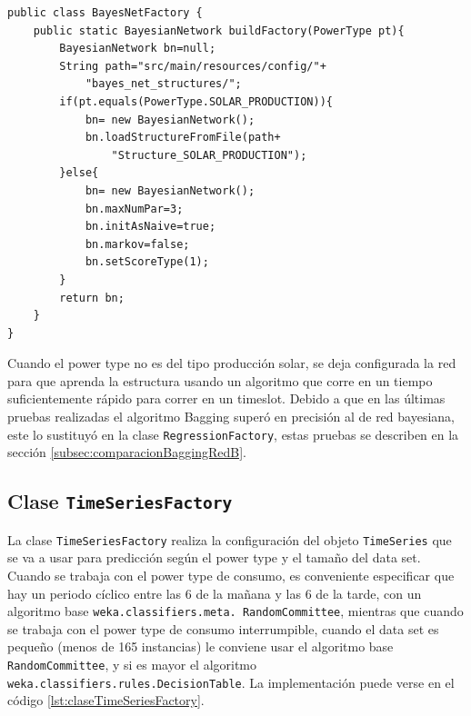 \begin{lstlisting}[frame=single]  
public class BayesNetFactory {
	public static BayesianNetwork buildFactory(PowerType pt){
		BayesianNetwork bn=null;
		String path="src/main/resources/config/"+
			"bayes_net_structures/";
		if(pt.equals(PowerType.SOLAR_PRODUCTION)){
			bn= new BayesianNetwork();
			bn.loadStructureFromFile(path+
				"Structure_SOLAR_PRODUCTION");
		}else{
			bn= new BayesianNetwork(); 
			bn.maxNumPar=3;
			bn.initAsNaive=true;
			bn.markov=false;
			bn.setScoreType(1);
		}
		return bn;
	}
}
\end{lstlisting}
Cuando el power type no es del tipo producción solar, se deja configurada la red para que aprenda la estructura usando un algoritmo que corre en un tiempo suficientemente rápido para correr en un timeslot. Debido a que en las últimas pruebas realizadas el algoritmo Bagging superó en precisión al de red bayesiana, este lo sustituyó en la clase \texttt{RegressionFactory}, estas pruebas se describen en la sección \ref{subsec:comparacionBaggingRedB}.

\subsection{Clase \texttt{TimeSeriesFactory}} \label{subsec:claseTimeSeriesFactory}
La clase \texttt{TimeSeriesFactory} realiza la configuración del objeto \texttt{TimeSeries} que se va a usar para predicción según el power type y el tamaño del data set. Cuando se trabaja con el power type de consumo, es conveniente especificar que hay un periodo cíclico entre las 6 de la mañana y las 6 de la tarde, con un algoritmo base \texttt{weka.classifiers.meta. RandomCommittee}, mientras que cuando se trabaja con el power type de consumo interrumpible, cuando el data set es pequeño (menos de 165 instancias) le conviene usar el algoritmo base \texttt{RandomCommittee}, y si es mayor el algoritmo \texttt{weka.classifiers.rules.DecisionTable}. La implementación puede verse en el código \ref{lst:claseTimeSeriesFactory}.



